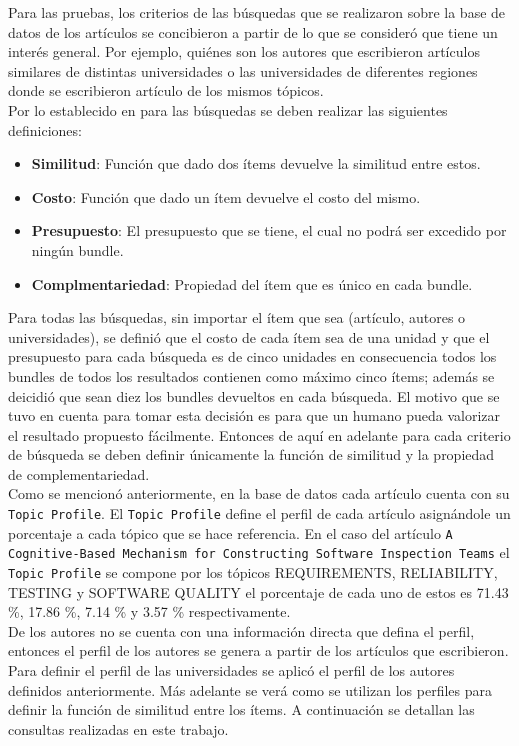 Para las pruebas, los criterios de las búsquedas que se realizaron sobre la base de datos de los artículos se concibieron a partir de lo que se consideró que tiene un interés general. Por ejemplo, quiénes son los autores que escribieron artículos similares de distintas universidades o las universidades de diferentes regiones donde se escribieron artículo de los mismos tópicos.\\
Por lo establecido en \cite{compositeRetrival} para las búsquedas se deben realizar las siguientes definiciones:
\begin{itemize}
  \item \textbf{Similitud}: Función que dado dos ítems devuelve la similitud entre estos.
  \item \textbf{Costo}: Función que dado un ítem devuelve el costo del mismo.
  \item \textbf{Presupuesto}: El presupuesto que se tiene, el cual no podrá ser excedido por ningún bundle.
  \item \textbf{Complmentariedad}: Propiedad del ítem que es único en cada bundle.
\end{itemize}
Para todas las búsquedas, sin importar el ítem que sea (artículo, autores o universidades),  se definió que el costo de cada ítem sea de una unidad y que el presupuesto para cada búsqueda es de cinco unidades en consecuencia todos los bundles de todos los resultados contienen como máximo cinco ítems; además se deicidió que sean diez los bundles devueltos en cada búsqueda. El motivo que se tuvo en cuenta para tomar esta decisión es para que un humano pueda valorizar el resultado propuesto fácilmente. Entonces de aquí en adelante para cada criterio de búsqueda se deben definir únicamente la función de similitud y la propiedad de complementariedad.\\
Como se mencionó anteriormente, en la base de datos cada artículo cuenta con su \texttt{Topic Profile}. El \texttt{Topic Profile} define el perfil de cada artículo asignándole un porcentaje a cada tópico que se hace referencia. En el caso del artículo \texttt{A Cognitive-Based Mechanism for Constructing Software Inspection Teams} el \texttt{Topic Profile} se compone por los tópicos  REQUIREMENTS, RELIABILITY, TESTING y SOFTWARE QUALITY el porcentaje de cada uno de estos es 71.43 \%, 17.86 \%, 7.14 \% y 3.57 \% respectivamente. \\
De los autores no se cuenta con una información directa que defina el perfil, entonces el perfil de los autores se genera a partir de los artículos que escribieron. Para definir el perfil de las universidades se aplicó el perfil de los autores definidos anteriormente. Más adelante se verá como se utilizan los perfiles para definir la función de similitud entre los ítems. A continuación se detallan las consultas realizadas en este trabajo.\\
